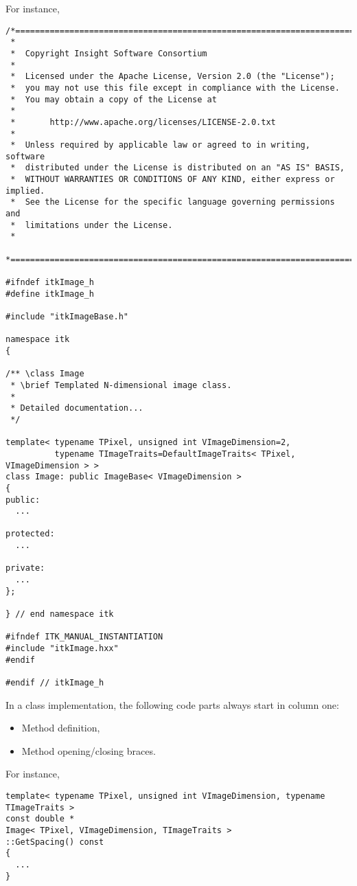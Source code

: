 For instance,

\small
\begin{verbatim}
/*=========================================================================
 *
 *  Copyright Insight Software Consortium
 *
 *  Licensed under the Apache License, Version 2.0 (the "License");
 *  you may not use this file except in compliance with the License.
 *  You may obtain a copy of the License at
 *
 *       http://www.apache.org/licenses/LICENSE-2.0.txt
 *
 *  Unless required by applicable law or agreed to in writing, software
 *  distributed under the License is distributed on an "AS IS" BASIS,
 *  WITHOUT WARRANTIES OR CONDITIONS OF ANY KIND, either express or implied.
 *  See the License for the specific language governing permissions and
 *  limitations under the License.
 *
 *=========================================================================*/

#ifndef itkImage_h
#define itkImage_h

#include "itkImageBase.h"

namespace itk
{

/** \class Image
 * \brief Templated N-dimensional image class.
 *
 * Detailed documentation...
 */

template< typename TPixel, unsigned int VImageDimension=2,
          typename TImageTraits=DefaultImageTraits< TPixel, VImageDimension > >
class Image: public ImageBase< VImageDimension >
{
public:
  ...

protected:
  ...

private:
  ...
};

} // end namespace itk

#ifndef ITK_MANUAL_INSTANTIATION
#include "itkImage.hxx"
#endif

#endif // itkImage_h
\end{verbatim}
\normalsize

In a class implementation, the following code parts always start in column one:
\begin{itemize}
\item Method definition,
\item Method opening/closing braces.
\end{itemize}

For instance,

\small
\begin{verbatim}
template< typename TPixel, unsigned int VImageDimension, typename TImageTraits >
const double *
Image< TPixel, VImageDimension, TImageTraits >
::GetSpacing() const
{
  ...
}
\end{verbatim}
\normalsize

